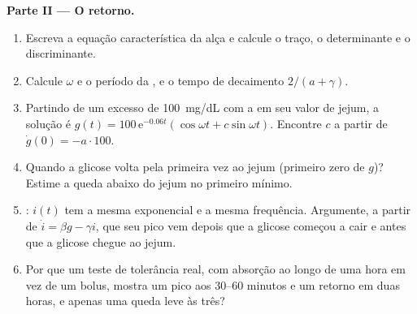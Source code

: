 \begin{problem}
\medskip
\noindent\textbf{Parte II --- O retorno.}
\begin{enumerate}[resume]
  \item Escreva a equação característica da alça e calcule o traço, o
        determinante e o discriminante.
  \item Calcule $\omega$ e o período da , e o tempo
        de decaimento $2/(a + \gamma)$.
  \item Partindo de um excesso de \qty{100}{mg/dL} com a  em seu
        valor de jejum, a solução é $g(t) = 100\,\mathrm{e}^{-0.06t}
        (\cos\omega t + c\sin\omega t)$. Encontre $c$ a partir de $\dot g(0) = -a\cdot
        100$.
  \item Quando a glicose volta pela primeira vez ao jejum (primeiro zero
        de $g$)? Estime a queda abaixo do jejum no primeiro mínimo.
  \item {}: $i(t)$ tem a mesma exponencial e a mesma frequência.
        Argumente, a partir de $\dot i = \beta g - \gamma i$, que seu
        pico vem depois que a glicose começou a cair e antes que a
        glicose chegue ao jejum.
  \item Por que um teste de tolerância real, com absorção ao longo de uma
        hora em vez de um bolus, mostra um pico aos 30--60 minutos e um
        retorno em duas horas, e apenas uma queda leve às três?
\end{enumerate}


\end{problem}
